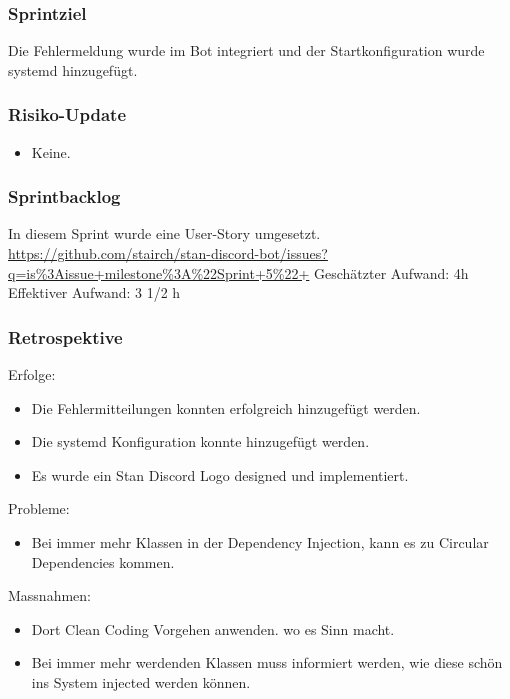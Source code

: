 \documentclass[a4paper, table]{article}
\begin{document}
\subsubsection*{Sprintziel}
Die Fehlermeldung wurde im Bot integriert und der Startkonfiguration wurde systemd hinzugefügt.

\subsubsection*{Risiko-Update}
\begin{itemize}
    \item Keine.
\end{itemize}

\subsubsection*{Sprintbacklog}
In diesem Sprint wurde eine User-Story umgesetzt.\\
\url{https://github.com/stairch/stan-discord-bot/issues?q=is%3Aissue+milestone%3A%22Sprint+5%22+}
\newline
Geschätzter Aufwand: 4h
\newline
Effektiver Aufwand: 3 1/2 h

\subsubsection*{Retrospektive}
Erfolge:
\begin{itemize}
    \item Die Fehlermitteilungen konnten erfolgreich hinzugefügt werden.
    \item Die systemd Konfiguration konnte hinzugefügt werden.
    \item Es wurde ein Stan Discord Logo designed und implementiert.
\end{itemize}
Probleme:
\begin{itemize}
    \item Bei immer mehr Klassen in der Dependency Injection, kann es zu Circular Dependencies kommen.
\end{itemize}
Massnahmen:
\begin{itemize}
    \item Dort Clean Coding Vorgehen anwenden. wo es Sinn macht.
    \item Bei immer mehr werdenden Klassen muss informiert werden, wie diese schön ins System injected werden können.
\end{itemize}
\end{document}
